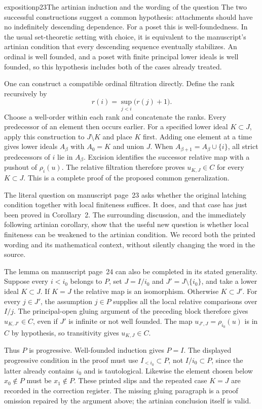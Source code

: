 \begin{dcomment}{exposition}{p23}{The artinian induction and the wording of the question}
The two successful constructions suggest a common hypothesis: attachments should have no indefinitely descending dependence. For a poset this is well-foundedness. In the usual set-theoretic setting with choice, it is equivalent to the manuscript's artinian condition that every descending sequence eventually stabilizes. An ordinal is well founded, and a poset with finite principal lower ideals is well founded, so this hypothesis includes both of the cases already treated.

One can construct a compatible ordinal filtration directly. Define the rank recursively by
\[
 r(i)=\sup_{j<i}\bigl(r(j)+1\bigr).
\]
Choose a well-order within each rank and concatenate the ranks. Every predecessor of an element then occurs earlier. For a specified lower ideal $K\subset J$, apply this construction to $J\setminus K$ and place $K$ first. Adding one element at a time gives lower ideals $A_\beta$ with $A_0=K$ and union $J$. When $A_{\beta+1}=A_\beta\cup\{i\}$, all strict predecessors of $i$ lie in $A_\beta$. Excision identifies the successor relative map with a pushout of $\rho_i(u)$. The relative filtration therefore proves $u_{K,J}\in C$ for every $K\subset J$. This is a complete proof of the proposed common generalization.

The literal question on manuscript page~23 asks whether the original latching condition together with local finiteness suffices. It does, and that case has just been proved in Corollary~2. The surrounding discussion, and the immediately following artinian corollary, show that the useful new question is whether local finiteness can be weakened to the artinian condition. We record both the printed wording and its mathematical context, without silently changing the word in the source.

The lemma on manuscript page~24 can also be completed in its stated generality. Suppose every $i<i_0$ belongs to $P$, set $J=I/i_0$ and $J'=J\setminus\{i_0\}$, and take a lower ideal $K\subset J$. If $K=J$ the relative map is an isomorphism. Otherwise $K\subset J'$. For every $j\in J'$, the assumption $j\in P$ supplies all the local relative comparisons over $I/j$. The principal-open gluing argument of the preceding block therefore gives $u_{K,J'}\in C$, even if $J'$ is infinite or not well founded. The map $u_{J',J}=\rho_{i_0}(u)$ is in $C$ by hypothesis, so transitivity gives $u_{K,J}\in C$.

Thus $P$ is progressive. Well-founded induction gives $P=I$. The displayed progressive condition in the proof must use $I_{<i_0}\subset P$, not $I/i_0\subset P$, since the latter already contains $i_0$ and is tautological. Likewise the element chosen below $x_0\notin P$ must be $x_1\notin P$. These printed slips and the repeated case $K=J$ are recorded in the correction register. The missing gluing paragraph is a proof omission repaired by the argument above; the artinian conclusion itself is valid.
\end{dcomment}

